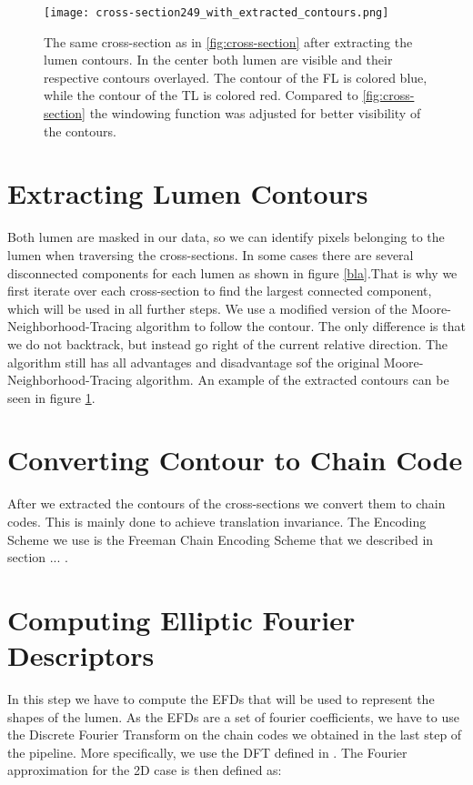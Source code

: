 \documentclass[thesis.tex]{subfiles}
\begin{document}
\begin{figure}[h]
\centering
\texttt{[image: cross-section249\_with\_extracted\_contours.png]}
\caption{The same cross-section as in \ref{fig:cross-section} after extracting the lumen contours. In the center both lumen are visible and their respective contours overlayed. The contour of the FL is colored blue, while the contour of the TL is colored red. Compared to \ref{fig:cross-section} the windowing function was adjusted for better visibility of the contours.}
\label{fig:extracted_contours}
\end{figure} 

\section{Extracting Lumen Contours}
Both lumen are masked in our data, so we can identify pixels belonging to the lumen when traversing the cross-sections. In some cases there are several disconnected components for each lumen as shown in figure \ref{bla}.That is why we first iterate over each cross-section to find the largest connected component, which will be used  in all further steps. We use a modified version of the Moore-Neighborhood-Tracing algorithm to follow the contour. The only difference is that we do not backtrack, but instead go right of the current relative direction. The algorithm still has all advantages and disadvantage sof the original Moore-Neighborhood-Tracing algorithm. An example of the extracted contours can be seen in figure \ref{fig:extracted_contours}.

\section{Converting Contour to Chain Code}
After we extracted the contours of the cross-sections we convert them to chain codes. This is mainly done to achieve translation invariance. The Encoding Scheme we use is the Freeman Chain Encoding Scheme that we described in section ... . 

\section{Computing Elliptic Fourier Descriptors}
In this step we have to compute the EFDs that will be used to represent the shapes of the lumen. As the EFDs are a set of fourier coefficients, we have to use the Discrete Fourier Transform on the chain codes we obtained in the last step of the pipeline. More specifically, we use the DFT defined in \cite{giardinia}. The Fourier approximation for the 2D case is then defined as:
\end{document}
